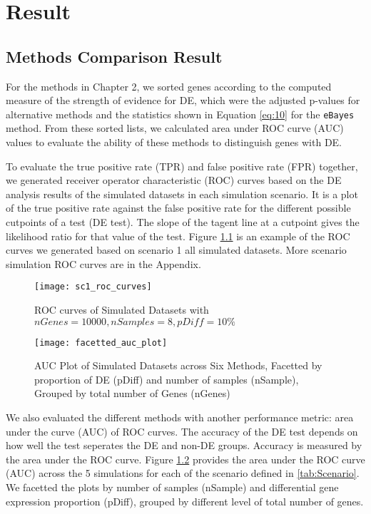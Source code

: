 \chapter{Result}

\section{Methods Comparison Result}

For the methods in Chapter 2, we sorted genes according to the computed measure of the strength of evidence for DE, which were the adjusted p-values for alternative methods and the statistics shown in Equation \eqref{eq:10} for the \texttt{eBayes} method. From these sorted lists, we calculated area under ROC curve (AUC) values to evaluate the ability of these methods to distinguish genes with DE. 

To evaluate the true positive rate (TPR) and false positive rate (FPR) together, we generated receiver operator characteristic (ROC) curves based on the DE analysis results of the simulated datasets in each simulation scenario. It is a plot of the true positive rate against the false positive rate for the different possible cutpoints of a test (DE test). The slope of the tagent line at a cutpoint gives the likelihood ratio for that value of the test. Figure \ref{sc1_roc_curves} is an example of the ROC curves we generated based on scenario 1 all simulated datasets. More scenario simulation ROC curves are in the Appendix. 

\begin{figure}[h!tb] 
\texttt{[image: sc1\_roc\_curves]}
\caption{ROC curves of Simulated Datasets with $nGenes=10000, nSamples=8, pDiff=10\%$}
\label{sc1_roc_curves}
\end{figure}


\begin{figure}[h!tb] 
\texttt{[image: facetted\_auc\_plot]}
\caption{AUC Plot of Simulated Datasets across Six Methods, Facetted by proportion of DE (pDiff) and number of samples (nSample), Grouped by total number of Genes (nGenes)}
\label{auc}
\end{figure}


We also evaluated the different methods with another performance metric: area under the curve (AUC) of ROC curves. The accuracy of the DE test depends on how well the test seperates the DE and non-DE groups. Accuracy is measured by the area under the ROC curve. Figure \ref{auc} provides the area under the ROC curve (AUC) across the 5 simulations for each of the scenario defined in \ref{tab:Scenario}. We facetted the plots by number of samples (nSample) and differential gene expression proportion (pDiff), grouped by different level of total number of genes. 

